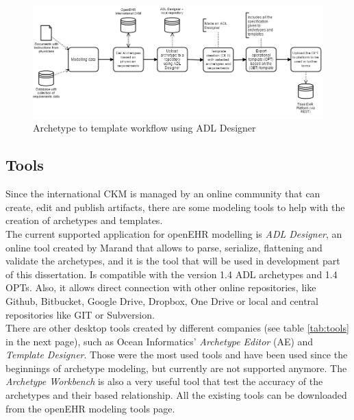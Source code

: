 \documentclass[mim_thesis.tex]{subfiles}
\begin{document}
\begin{figure}[H]
	\centering
    \includegraphics[width=1.1\textwidth]{img/OET_OPT.PNG}
	\caption{Archetype to template workflow using ADL Designer}
	\label{fig:OET_OPT}
\end{figure}



\subsection{Tools}
Since the international CKM is managed by an online community that can create, edit and publish artifacts, there are some modeling tools to help with the creation of archetypes and templates.\\ 

The current supported application for openEHR modelling is \textit{ADL Designer}, an online tool created by Marand that allows to parse, serialize, flattening and validate the archetypes, and it is the tool that will be used in development part of this dissertation. Is compatible with the version 1.4 ADL archetypes and 1.4 OPTs. Also, it allows direct connection with other online repositories, like Github, Bitbucket, Google Drive, Dropbox, One Drive or local and central repositories like GIT or Subversion.\\ 

There are other desktop tools created by different companies (see table \ref{tab:tools} in the next page), such as Ocean Informatics’ \textit{Archetype Editor} (AE) and \textit{Template Designer}. Those were the most used tools and have been used since the beginnings of archetype modeling, but currently are not supported anymore. The \textit{Archetype Workbench} is also a very useful tool that test the accuracy of the archetypes and their based relationship. All the existing tools can be downloaded from the openEHR modeling tools page. 
\vfill
~
\end{document}

